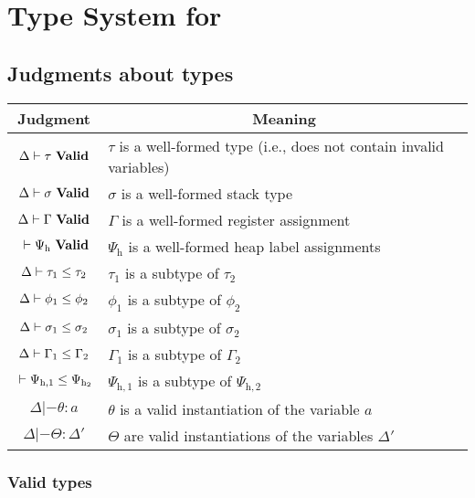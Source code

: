 \chapter{Type System for \ATAL}
\label{chap:types}


\section{Judgments about types}

\begin{tabular}{|c|p{7.5 cm}|}
  \hline
  Judgment & \multicolumn{1}{|c|}{Meaning} \\
  \hline

  $\valid{\Delta}{\tau}$ & $\tau$ is a well-formed type (i.e., does not contain invalid variables) \\
  ${\Delta} |- {\sigma}\ \mathbf{Valid}$ & $\sigma$ is a well-formed stack type \\
  ${\Delta} |- {\Gamma}\ \mathbf{Valid}$ & $\Gamma$ is a well-formed register assignment \\
  ${} |- {\Psi_{\mathrm{h}}}\ \mathbf{Valid}$ & $\Psi_{\mathrm{h}}$ is a well-formed heap label assignments \\
  \hline

  ${\Delta} |- {\tau_1} \le {\tau_2}$ & $\tau_1$ is a subtype of $\tau_2$ \\
  ${\Delta} |- {\phi_1} \le {\phi_2}$ & $\phi_1$ is a subtype of $\phi_2$ \\
  ${\Delta} |- {\sigma_1} \le {\sigma_2}$ & $\sigma_1$ is a subtype of $\sigma_2$ \\
  ${\Delta} |- {\Gamma_1} \le {\Gamma_2}$ & $\Gamma_1$ is a subtype of $\Gamma_2$ \\
  ${} |- {\Psi_{\mathrm{h},1}} \le {\Psi_{\mathrm{h}_2}}$ & $\Psi_{\mathrm{h},1}$ is a subtype of $\Psi_{\mathrm{h},2}$ \\
  \hline

  $\Delta |- \theta : a$ & $\theta$ is a valid instantiation of the variable $a$ \\
  $\Delta |- \Theta : \Delta'$ & $\Theta$ are valid instantiations of the variables $\Delta'$ \\
  \hline
\end{tabular}


\subsection{Valid types}
\fbox{$\valid{\Delta}{\tau}$}

